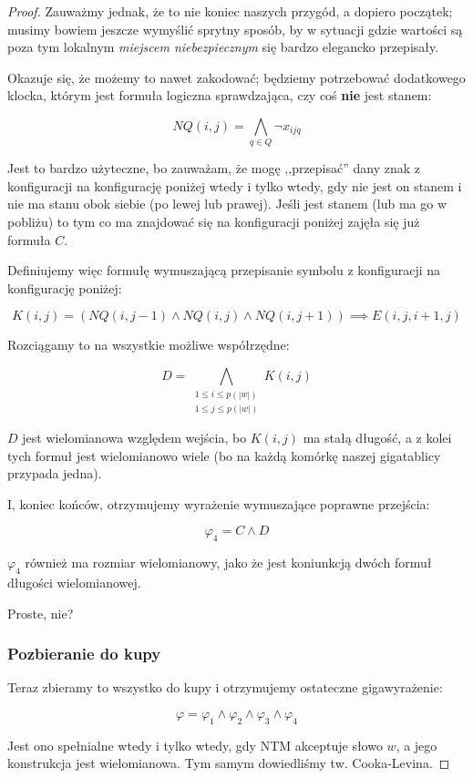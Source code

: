 \begin{proof}
        Zauważmy jednak, że to nie koniec naszych przygód, a dopiero początek; musimy bowiem jeszcze wymyślić sprytny sposób, by w sytuacji gdzie wartości są poza tym lokalnym \textit{miejscem niebezpiecznym} się bardzo elegancko przepisały. 
        
        Okazuje się, że możemy to nawet zakodować; będziemy potrzebować dodatkowego klocka, którym jest formuła logiczna sprawdzająca, czy coś \textbf{nie} jest stanem:
        
        \[
            NQ(i,j) = \bigwedge_{q \in Q} \neg x_{ijq}
        \]
        
        Jest to bardzo użyteczne, bo zauważam, że mogę ,,przepisać'' dany znak z konfiguracji na konfigurację poniżej wtedy i tylko wtedy, gdy nie jest on stanem i nie ma stanu obok siebie (po lewej lub prawej). Jeśli jest stanem (lub ma go w pobliżu) to tym co ma znajdować się na konfiguracji poniżej zajęła się już formuła \(C\).
        
        Definiujemy więc formułę wymuszającą przepisanie symbolu z konfiguracji na konfigurację poniżej: 
        
        \[ 
            K(i,j) = (NQ(i, j-1) \land NQ(i,j) \land NQ(i, j+1)) \implies E(i, j, i+1, j)
        \]
        
        Rozciągamy to na wszystkie możliwe współrzędne:
        
        \[ 
            D = \bigwedge_{\substack{1 \leq i \leq p(|w|) \\ 1 \leq j \leq p(|w|)}} K(i,j)
        \]
        
        \(D\) jest wielomianowa względem wejścia, bo \(K(i,j)\) ma stałą długość, a z kolei tych formuł jest wielomianowo wiele (bo na każdą komórkę naszej gigatablicy przypada jedna).
        
        I, koniec końców, otrzymujemy wyrażenie wymuszające poprawne przejścia: 
        
        \[ 
            \varphi_4 = C \land D
        \]
        
        \(\varphi_4\) również ma rozmiar wielomianowy, jako że jest koniunkcją dwóch formuł długości wielomianowej. 
        
        Proste, nie?
        
        \subsubsection{Pozbieranie do kupy}
        
        Teraz zbieramy to wszystko do kupy i otrzymujemy ostateczne gigawyrażenie:
        
        \[ 
            \varphi = \varphi_1 \land \varphi_2 \land \varphi_3 \land \varphi_4
        \]
        
        Jest ono spełnialne wtedy i tylko wtedy, gdy NTM akceptuje słowo \(w\), a jego konstrukcja jest wielomianowa. Tym samym dowiedliśmy tw. Cooka-Levina.
\end{proof}